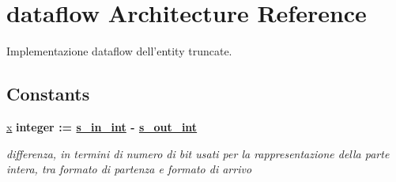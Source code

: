 \hypertarget{classtruncate_1_1dataflow}{\section{dataflow Architecture Reference}
\label{classtruncate_1_1dataflow}
}


Implementazione dataflow dell'entity truncate.  


\subsection*{Constants}
 \begin{DoxyCompactItemize}
\item 
\hyperlink{group___truncate_ga63701d8af27da7452a7588efcff357bc}{x} {\bfseries \textcolor{vhdlchar}{integer}\textcolor{vhdlchar}{ }\textcolor{vhdlchar}{ }\textcolor{vhdlchar}{\+:}\textcolor{vhdlchar}{=}\textcolor{vhdlchar}{ }\textcolor{vhdlchar}{ }\textcolor{vhdlchar}{ }\textcolor{vhdlchar}{ }{\bfseries \hyperlink{group___truncate_gabe72b503b8140ab0d84911165e959b53}{s\+\_\+in\+\_\+int}} \textcolor{vhdlchar}{-\/}\textcolor{vhdlchar}{ }\textcolor{vhdlchar}{ }\textcolor{vhdlchar}{ }{\bfseries \hyperlink{group___truncate_ga4ca792ca981e2f9d82bf36d9c82c08af}{s\+\_\+out\+\_\+int}} \textcolor{vhdlchar}{ }} 
\begin{DoxyCompactList}\small\item\em differenza, in termini di numero di bit usati per la rappresentazione della parte intera, tra formato di partenza e formato di arrivo \end{DoxyCompactList}\end{DoxyCompactItemize}
